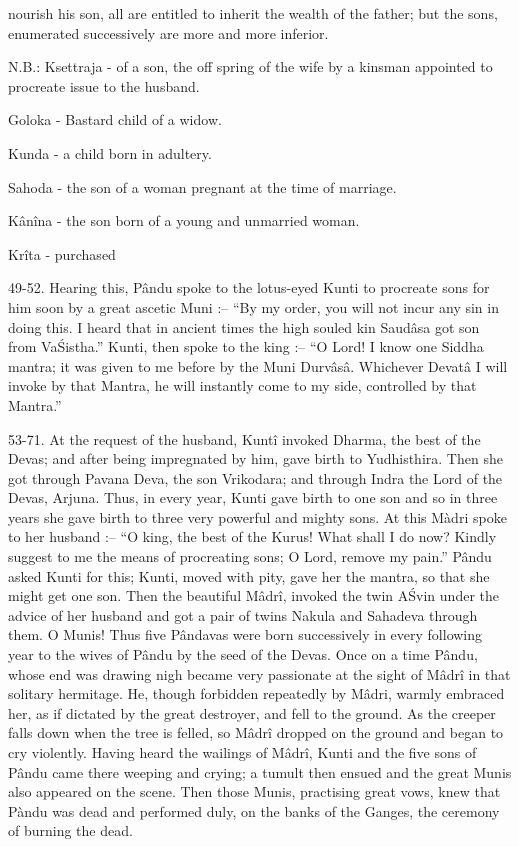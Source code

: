 nourish his son, all are entitled to inherit the wealth of the father; but the sons, enumerated successively are more and more inferior.

N.B.: Ksettraja - of a son, the off spring of the wife by a kinsman appointed to procreate issue to the husband.

        Goloka - Bastard child of a widow.

        Kunda - a child born in adultery.

        Sahoda - the son of a woman pregnant at the time of marriage.

        K\^an\^ina - the son born of a young and unmarried woman.

        Kr\^ita - purchased

49-52. Hearing this, P\^andu spoke to the lotus-eyed Kunti to procreate sons for him soon by a great ascetic Muni :-- ``By my order, you will not incur any sin in doing this. I heard that in ancient times the high souled kin Saud\^asa got son from Va\'Sistha.'' Kunti, then spoke to the king :-- ``O Lord! I know one Siddha mantra; it was given to me before by the Muni Durv\^as\^a. Whichever Devat\^a I will invoke by that Mantra, he will instantly come to my side, controlled by that Mantra.''

53-71. At the request of the husband, Kunt\^i invoked Dharma, the best of the Devas; and after being impregnated by him, gave birth to Yudhisthira. Then she got through Pavana Deva, the son Vrikodara; and through Indra the Lord of the Devas, Arjuna. Thus, in every year, Kunti gave birth to one son and so in three years she gave birth to three very powerful and mighty sons. At this Màdri spoke to her husband :-- ``O king, the best of the Kurus! What shall I do now? Kindly suggest to me the means of procreating sons; O Lord, remove my pain.'' P\^andu asked Kunti for this; Kunti, moved with pity, gave her the mantra, so that she might get one son. Then the beautiful M\^adr\^i, invoked the twin A\'Svin under the advice of her husband and got a pair of twins Nakula and Sahadeva through them. O Munis! Thus five P\^andavas were born successively in every following year to the wives of P\^andu by the seed of the Devas. Once on a time P\^andu, whose end was drawing nigh became very passionate at the sight of M\^adr\^i in that solitary hermitage. He, though forbidden repeatedly by M\^adri, warmly embraced her, as if dictated by the great destroyer, and fell to the ground. As the creeper falls down when the tree is felled, so M\^adr\^i dropped on the ground and began to cry violently. Having heard the wailings of M\^adr\^i, Kunti and the five sons of P\^andu came there weeping and crying; a tumult then ensued and the great Munis also appeared on the scene. Then those Munis, practising great vows, knew that Pàndu was dead and performed duly, on the banks of the Ganges, the ceremony of burning the dead.

